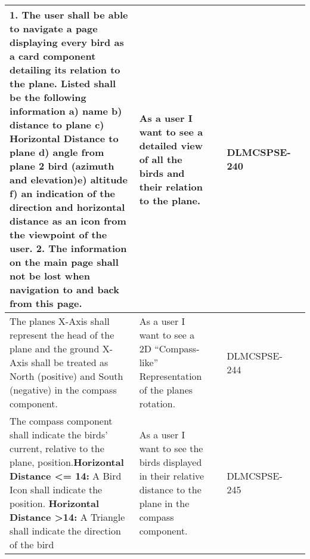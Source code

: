 \begin{xltabular}{\textwidth}{|X|X|M{1.8cm}|M{1.4cm}|M{1.3cm}|}
  \textbf{1.} The user shall be able to navigate a page displaying every bird as a card component detailing its relation to the plane. Listed shall be the following information \newline \textbf{a)} name \newline \textbf{b)} distance to plane \newline \textbf{c)} Horizontal Distance to plane \newline \textbf{d)} angle from plane 2 bird (azimuth and elevation)\newline \textbf{e)} altitude \newline \textbf{f)} an indication of the direction and horizontal distance as an icon from the viewpoint of the user. \newline \newline \textbf{2.} The information on the main page shall not be lost when navigation to and back from this page. & As a user I want to see a detailed view of all the birds and their relation to the plane. &  & {\color{purpleT}\ttfamily DLMCSPSE-240} &  \\ \hline 
  The planes X-Axis shall represent the head of the plane and the ground X-Axis shall be treated as North (positive) and South (negative) in the compass component. & As a user I want to see a 2D “Compass-like” Representation of the planes rotation. &  & {\color{purpleT}\ttfamily DLMCSPSE-244} &  \\ \hline 
  The compass component shall indicate the birds' current, relative to the plane, position.\newline \textbf{Horizontal Distance \textless = 14:} \newline A Bird Icon shall indicate the position. \newline \newline \textbf{Horizontal Distance \textgreater 14:} \newline A Triangle shall indicate the direction of the bird & As a user I want to see the birds displayed in their relative distance to the plane in the compass component. &  & {\color{purpleT}\ttfamily DLMCSPSE-245} &  \\ \hline 

\end{xltabular}
